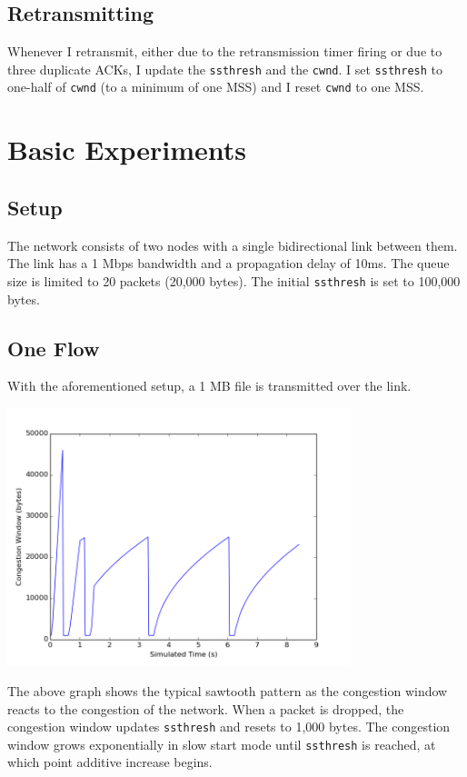 \documentclass[11pt]{article}
\newcommand{\code}[1]{\texttt{#1}}
\begin{document}
\subsection{Retransmitting}
Whenever I retransmit, either due to the retransmission timer firing or due to three duplicate ACKs, I update the \code{ssthresh} and the \code{cwnd}. I set \code{ssthresh} to one-half of \code{cwnd} (to a minimum of one MSS) and I reset \code{cwnd} to one MSS.

\section{Basic Experiments}

\subsection{Setup}
The network consists of two nodes with a single bidirectional link between them. The link has a 1 Mbps bandwidth and a propagation delay of 10ms. The queue size is limited to 20 packets (20,000 bytes). The initial \code{ssthresh} is set to 100,000 bytes.

\pagebreak
\subsection{One Flow}
With the aforementioned setup, a 1 MB file is transmitted over the link.

\includegraphics[width=10cm]{../graphs/one_flow_cwnd.png}

The above graph shows the typical sawtooth pattern as the congestion window reacts to the congestion of the network. When a packet is dropped, the congestion window updates \code{ssthresh} and resets to 1,000 bytes. The congestion window grows exponentially in slow start mode until \code{ssthresh} is reached, at which point additive increase begins.
\end{document}
